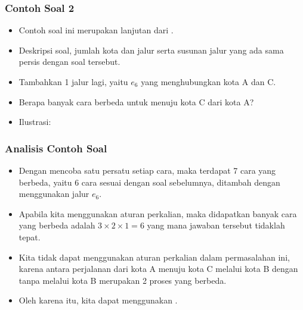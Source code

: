 \begin{frame}
\frametitle{Contoh Soal 2}
\begin{itemize}
  \item Contoh soal ini merupakan lanjutan dari .
  \item Deskripsi soal, jumlah kota dan jalur serta susunan jalur yang ada sama persis dengan soal tersebut.
  \item Tambahkan 1 jalur lagi, yaitu $e_{6}$ yang menghubungkan kota A dan C.
  \item Berapa banyak cara berbeda untuk menuju kota C dari kota A?
  \item Ilustrasi:
  \newline
\end{itemize}
\end{frame}

\begin{frame}
\frametitle{Analisis Contoh Soal}
\begin{itemize}
  \item Dengan mencoba satu persatu setiap cara, maka terdapat 7 cara yang berbeda, yaitu 6 cara sesuai dengan soal sebelumnya, ditambah dengan menggunakan jalur $e_{6}$.
  \item Apabila kita menggunakan aturan perkalian, maka didapatkan banyak cara yang berbeda adalah $3 \times 2 \times 1 = 6$ yang mana jawaban tersebut tidaklah tepat.
  \item Kita tidak dapat menggunakan aturan perkalian dalam permasalahan ini, karena antara perjalanan dari kota A menuju kota C melalui kota B dengan tanpa melalui kota B merupakan 2 proses yang berbeda.
  \item Oleh karena itu, kita dapat menggunakan .
\end{itemize}
\end{frame}

